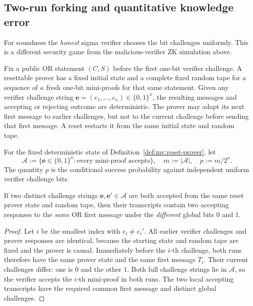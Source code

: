 \subsection{Two-run forking and quantitative knowledge error}\label{sec:mv:forking}
For soundness the \emph{honest} sigma verifier
chooses the bit challenges uniformly.
This is a different security game from the
malicious-verifier ZK simulation above.

\begin{definition}\label{def:mv:reset-prover}
Fix a public OR statement $(C,S)$ before
the first one-bit verifier challenge.
A resettable prover has a fixed initial
state and a complete fixed random tape
for a sequence of $\kappa$ fresh one-bit
mini-proofs for that same statement.
Given any verifier challenge string
$\mathbf e=(e_1,\ldots,e_\kappa)
\in\{0,1\}^\kappa$,
the resulting messages and accepting
or rejecting outcome are deterministic.
The prover may adapt its next first
message to earlier challenges, but not
to the current challenge before sending
that first message.
A reset restarts it from the same
initial state and random tape.
\end{definition}

\begin{definition}\label{def:mv:accepting-set}
For the fixed deterministic state of
Definition~\ref{def:mv:reset-prover},
let
\[
 \mathcal A:=\{\mathbf e\in\{0,1\}^{\kappa}:
       \text{every mini-proof accepts}\},\quad
 m:=|\mathcal A|,\quad p:=m/2^\kappa.
\]
The quantity $p$ is the conditional success
probability against independent uniform
verifier challenge bits.
\end{definition}

\begin{lemma}\label{lem:mv:earliest}
If two distinct challenge strings
$\mathbf e,\mathbf e'\in\mathcal A$
are both accepted from the same
reset prover state and random tape,
then their transcripts contain two
accepting responses to the
\emph{same} OR first message
under the \emph{different} global
bits $0$ and $1$.
\end{lemma}
\begin{proof}
Let $i$ be the smallest index
with $e_i\ne e_i'$.
All earlier verifier challenges
and prover responses are identical,
because the starting state and
random tape are fixed and the
prover is causal.
Immediately before the $i$-th
challenge, both runs therefore
have the same prover state
and the same first message $T_i$.
Their current challenges differ:
one is $0$ and the other $1$.
Both full challenge strings lie in
$\mathcal A$, so the verifier
accepts the $i$-th mini-proof
in both runs. The two local
accepting transcripts have the
required common first message
and distinct global challenges.
\end{proof}

